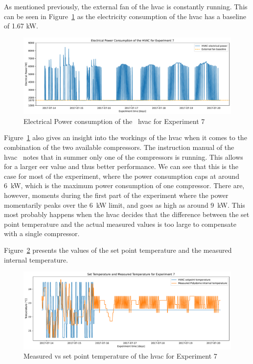 \clearpage

As mentioned previously, the external fan of the \acrshort{hvac} is constantly
running.  This can be seen in Figure~\ref{fig:Polydome_electricity} as the
electricity consumption of the \acrshort{hvac} has a baseline of 1.67 kW.

\begin{figure}[ht]
    \centering
    \includegraphics[width = \textwidth]{Plots/Fan_baseline.pdf}
    \caption{Electrical Power consumption of the \pdome\ \acrshort{hvac} for Experiment 7}
    \label{fig:Polydome_electricity}
\end{figure}

Figure~\ref{fig:Polydome_electricity} also gives an insight into the workings of
the \acrshort{hvac} when it comes to the combination of the two available
compressors. The instruction manual of the
\acrshort{hvac}~\cite{aermecRoofTopManuelSelection} notes that in summer only
one of the compressors is running. This allows for a larger \acrshort{eer} value
and thus better performance. We can see that this is the case for most of the
experiment, where the power consumption caps at around 6~kW, which is the
maximum power consumption of one compressor. There are, however, moments during
the first part of the experiment where the power momentarily peaks over the 6~kW
limit, and goes as high as around 9~kW. This most probably happens when the
\acrshort{hvac} decides that the difference between the set point temperature
and the actual measured values is too large to compensate with a single
compressor.

Figure~\ref{fig:Polydome_exp7_settemp} presents the values of the set point
temperature and the measured internal temperature. 

\begin{figure}[ht]
    \centering
    \includegraphics[width = \textwidth]{Plots/Exp_settemp.pdf}
    \caption{Measured vs set point temperature of the \acrshort{hvac} for Experiment 7}
    \label{fig:Polydome_exp7_settemp}
\end{figure}

